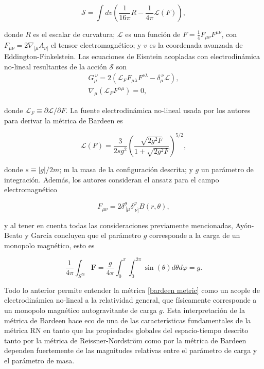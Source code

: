 \documentclass[16pt,a4paper]{article}
\numberwithin{equation}{section}
\theoremstyle{definition}
\begin{document}
\begin{equation}
\mathcal{S} = \int dv \left( \frac{1}{16 \pi}R - \frac{1}{4 \pi}\mathcal{L}(F) \right),
\end{equation}

donde $R$ es el escalar de curvatura; $\mathcal{L}$ es una función de $F = \frac{1}{4}F_{\mu \nu}F^{\mu \nu}$, con $F_{\mu \nu} = 2\nabla_{[\mu}A_{\nu]}$ el tensor electromagnético; y $v$ es la coordenada avanzada de Eddington-Finkelstein. Las ecuaciones de Eisntein acopladas con electrodinámica no-lineal resultantes de la acción $\mathcal{S}$ son\\

\begin{equation}
\label{euler lagrange eqns}
\begin{aligned}
G_{\mu}^{\ \nu} = 2(\mathcal{L}_{F} F_{\mu \lambda} F^{\nu \lambda} - \delta_{\mu}^{\ \nu} \mathcal{L}),\\
\nabla_{\mu}(\mathcal{L}_{F} F^{\alpha \mu}) = 0,
\end{aligned}
\end{equation}

donde $\mathcal{L}_{F} \equiv \partial \mathcal{L}/\partial F$. La fuente electrodinámica no-lineal usada por los autores para derivar la métrica de Bardeen es 

\begin{equation}
\label{nonlinear bardeen}
\mathcal{L}(F) = \frac{3}{2sg^2}\left( \frac{\sqrt{2g^2F}}{1 + \sqrt{2g^2F}} \right)^{5/2},
\end{equation}

donde $s \equiv |g|/2m$; m la masa de la configuración descrita; y $g$ un parámetro de integración. Además, los autores consideran el ansatz para el campo electromagnético 

\begin{equation}
F_{\mu \nu} = 2 \delta^{\theta}_{\ \lbrack\mu} \delta^{\varphi}_{\ \nu\rbrack} B(r, \theta),
\end{equation}

y al tener en cuenta todas las consideraciones previamente mencionadas, Ayón-Beato y García concluyen que el parámetro $g$ corresponde a la carga de un monopolo magnético, esto es 

\begin{equation}
\frac{1}{4 \pi} \int_{S^{\infty}}\mathbf{F} = \frac{g}{4 \pi} \int_{0}^{\pi}\int_{0}^{2\pi}\sin (\theta) d\theta d\varphi = g.
\end{equation}

Todo lo anterior permite entender la métrica \eqref{bardeen metric} como un acople de electrodinámica no-lineal a la relatividad general, que físicamente corresponde a un monopolo magnético autogravitante de carga $g$. Esta interpretación de la métrica de Bardeen hace eco de una de las características fundamentales de la métrica RN en tanto que las propiedades globales del espacio-tiempo descrito tanto por la métrica de Reissner-Nordström como por la métrica de Bardeen dependen fuertemente de las magnitudes relativas entre el parámetro de carga y el parámetro de masa.\\
\end{document}

